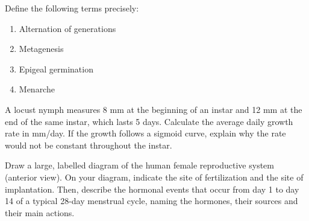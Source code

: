 \documentclass[11pt]{article}
\newcounter{popsec}
\newcounter{popsub}
\newcommand{\courssub}[1]{%
  \stepcounter{popsub}%
  \par\vspace{9pt}\noindent{\popxbold\fontsize{11.5}{13}\selectfont\color{popink}{\color{poporange}\thepopsec.\thepopsub}\hspace{6pt}#1}\par\nopagebreak\vspace{4pt}
}
\begin{document}
\begin{exercice}[Definitions]
Define the following terms precisely:
\begin{enumerate}
\item Alternation of generations
\item Metagenesis
\item Epigeal germination
\item Menarche
\end{enumerate}
\end{exercice}

\begin{exercice}
A locust nymph measures 8 mm at the beginning of an instar and 12 mm at the end of the same instar, which lasts 5 days. Calculate the average daily growth rate in mm/day. If the growth follows a sigmoid curve, explain why the rate would not be constant throughout the instar.
\end{exercice}

\courssub{I practise}

\begin{exercice}
Draw a large, labelled diagram of the human female reproductive system (anterior view). On your diagram, indicate the site of fertilization and the site of implantation. Then, describe the hormonal events that occur from day 1 to day 14 of a typical 28-day menstrual cycle, naming the hormones, their sources and their main actions.
\end{exercice}
\end{document}
